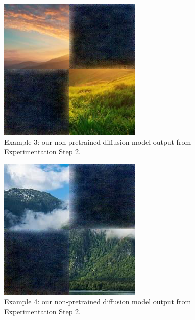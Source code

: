 \documentclass[sigconf]{acmart}
\begin{document}
\begin{figure}[h!]
    \centering
    \includegraphics[width=\linewidth]{diffusion_step_2_3}
    \caption{Example 3: our non-pretrained diffusion model output from Experimentation Step 2.}
    \label{fig:diffusion_step_2_3}
\end{figure}

\begin{figure}[h!]
    \centering
    \includegraphics[width=\linewidth]{diffusion_step_2_4}
    \caption{Example 4: our non-pretrained diffusion model output from Experimentation Step 2.}
    \label{fig:diffusion_step_2_4}
\end{figure}
\end{document}
